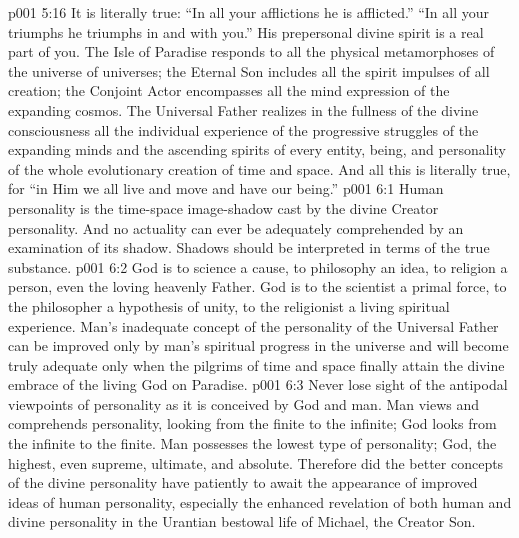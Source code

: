 \vs p001 5:16 It is literally true: “In all your afflictions he is afflicted.” “In all your triumphs he triumphs in and with you.” His prepersonal divine spirit is a real part of you. The Isle of Paradise responds to all the physical metamorphoses of the universe of universes; the Eternal Son includes all the spirit impulses of all creation; the Conjoint Actor encompasses all the mind expression of the expanding cosmos. The Universal Father realizes in the fullness of the divine consciousness all the individual experience of the progressive struggles of the expanding minds and the ascending spirits of every entity, being, and personality of the whole evolutionary creation of time and space. And all this is literally true, for “in Him we all live and move and have our being.”
\vs p001 6:1 Human personality is the time\hyp{}space image\hyp{}shadow cast by the divine Creator personality. And no actuality can ever be adequately comprehended by an examination of its shadow. Shadows should be interpreted in terms of the true substance.
\vs p001 6:2 \pc God is to science a cause, to philosophy an idea, to religion a person, even the loving heavenly Father. God is to the scientist a primal force, to the philosopher a hypothesis of unity, to the religionist a living spiritual experience. Man’s inadequate concept of the personality of the Universal Father can be improved only by man’s spiritual progress in the universe and will become truly adequate only when the pilgrims of time and space finally attain the divine embrace of the living God on Paradise.
\vs p001 6:3 Never lose sight of the antipodal viewpoints of personality as it is conceived by God and man. Man views and comprehends personality, looking from the finite to the infinite; God looks from the infinite to the finite. Man possesses the lowest type of personality; God, the highest, even supreme, ultimate, and absolute. Therefore did the better concepts of the divine personality have patiently to await the appearance of improved ideas of human personality, especially the enhanced revelation of both human and divine personality in the Urantian bestowal life of Michael, the Creator Son.
